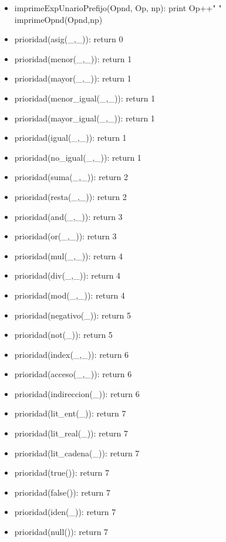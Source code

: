 \documentclass[11pt]{article}
\begin{document}
\begin{itemize}
            \item imprimeExpUnarioPrefijo(Opnd, Op, np):
                \subitem print Op++" " 
                \subitem imprimeOpnd(Opnd,np)
            
            \item prioridad(asig(\_,\_)): return 0
            \item prioridad(menor(\_,\_)): return 1
            \item prioridad(mayor(\_,\_)): return 1
            \item prioridad(menor\_igual(\_,\_)): return 1
            \item prioridad(mayor\_igual(\_,\_)): return 1
            \item prioridad(igual(\_,\_)): return 1
            \item prioridad(no\_igual(\_,\_)): return 1
            \item prioridad(suma(\_,\_)): return 2
            \item prioridad(resta(\_,\_)): return 2
            \item prioridad(and(\_,\_)): return 3
            \item prioridad(or(\_,\_)): return 3
            \item prioridad(mul(\_,\_)): return 4
            \item prioridad(div(\_,\_)): return 4
            \item prioridad(mod(\_,\_)): return 4
            \item prioridad(negativo(\_)): return 5
            \item prioridad(not(\_)): return 5
            \item prioridad(index(\_,\_)): return 6
            \item prioridad(acceso(\_,\_)): return 6
            \item prioridad(indireccion(\_)): return 6
            \item prioridad(lit\_ent(\_)): return 7
            \item prioridad(lit\_real(\_)): return 7
            \item prioridad(lit\_cadena(\_)): return 7
            \item prioridad(true()): return 7
            \item prioridad(false()): return 7
            \item prioridad(iden(\_)): return 7
            \item prioridad(null()): return 7
        \end{itemize}
    
\end{document}
